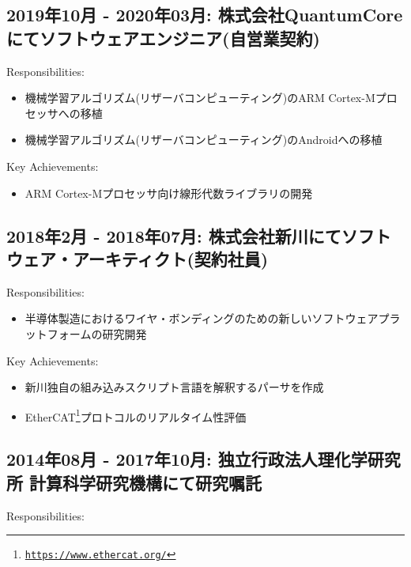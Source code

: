 \documentclass[letterpaper]{article}
\begin{document}
\subsection*{2019年10月 - 2020年03月: 株式会社QuantumCore にてソフトウェアエンジニア(自営業契約)}

\noindent Responsibilities:

\begin{itemize}
  \item 機械学習アルゴリズム(リザーバコンピューティング)のARM Cortex-Mプロセッサへの移植
  \item 機械学習アルゴリズム(リザーバコンピューティング)のAndroidへの移植
\end{itemize}

\noindent Key Achievements:

\begin{itemize}
  \item ARM Cortex-Mプロセッサ向け線形代数ライブラリの開発
\end{itemize}

\subsection*{2018年2月 - 2018年07月: 株式会社新川にてソフトウェア・アーキティクト(契約社員)}

\noindent Responsibilities:

\begin{itemize}
  \item 半導体製造におけるワイヤ・ボンディングのための新しいソフトウェアプラットフォームの研究開発
\end{itemize}

\noindent Key Achievements:

\begin{itemize}
  \item 新川独自の組み込みスクリプト言語を解釈するパーサを作成
  \item EtherCAT\footnote{\href{https://www.ethercat.org/}{\tt https://www.ethercat.org/}}プロトコルのリアルタイム性評価
\end{itemize}

\subsection*{2014年08月 - 2017年10月: 独立行政法人理化学研究所 計算科学研究機構にて研究嘱託}

\noindent Responsibilities:
\end{document}
